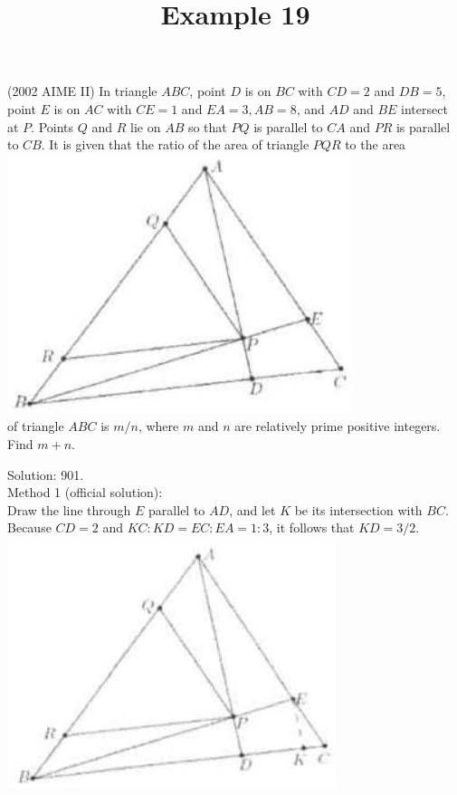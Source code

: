 \documentclass{article}
\title{Example 19}
\date{}
\begin{document}
\maketitle

(2002 AIME II) In triangle \(A B C\), point \(D\) is on \(B C\) with \(C D=2\) and \(D B=5\), point \(E\) is on \(A C\) with \(C E=1\) and \(E A=3, A B=8\), and \(A D\) and \(B E\) intersect at \(P\). Points \(Q\) and \(R\) lie on \(A B\) so that \(P Q\) is parallel to \(C A\) and \(P R\) is parallel to \(C B\). It is given that the ratio of the area of triangle \(P Q R\) to the area\\
\centering
\includegraphics[width=\textwidth]{images/121(2).jpg}\\
of triangle \(A B C\) is \(m / n\), where \(m\) and \(n\) are relatively prime positive integers. Find \(m+n\).

Solution: 901.\\
Method 1 (official solution):\\
Draw the line through \(E\) parallel to \(A D\), and let \(K\) be its intersection with \(B C\).\\
Because \(C D=2\) and \(K C: K D=E C: E A=1: 3\), it follows that \(K D=3 / 2\).\\
\centering
\includegraphics[width=\textwidth]{images/122.jpg}
\end{document}
